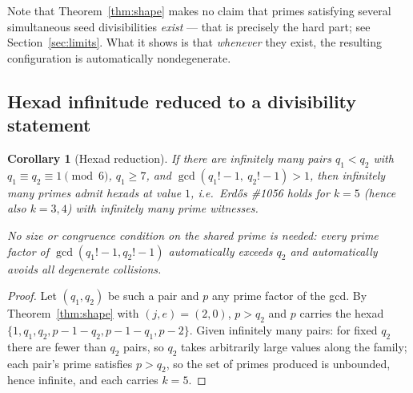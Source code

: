 \documentclass[11pt]{article}
\newtheorem{corollary}[theorem]{Corollary}
\theoremstyle{definition}
\theoremstyle{remark}
\begin{document}
Note that Theorem~\ref{thm:shape} makes no claim that primes satisfying
several simultaneous seed divisibilities \emph{exist} --- that is precisely
the hard part; see Section~\ref{sec:limits}. What it shows is that
\emph{whenever} they exist, the resulting configuration is automatically
nondegenerate.

\subsection{Hexad infinitude reduced to a divisibility statement}

\begin{corollary}[Hexad reduction]\label{cor:hexad}
If there are infinitely many pairs $q_1 < q_2$ with
$q_1 \equiv q_2 \equiv 1 \pmod 6$, $q_1 \ge 7$, and
$\gcd(q_1! - 1,\ q_2! - 1) > 1$, then infinitely many primes admit hexads at
value $1$, i.e.\ Erd\H{o}s \#1056 holds for $k = 5$ (hence also $k = 3, 4$)
with infinitely many prime witnesses.

No size or congruence condition on the shared prime is needed: every prime
factor of $\gcd(q_1!-1, q_2!-1)$ automatically exceeds $q_2$ and
automatically avoids all degenerate collisions.
\end{corollary}

\begin{proof}
Let $(q_1, q_2)$ be such a pair and $p$ any prime factor of the gcd. By
Theorem~\ref{thm:shape} with $(j, e) = (2, 0)$, $p > q_2$ and $p$ carries the
hexad $\{1, q_1, q_2, p-1-q_2, p-1-q_1, p-2\}$. Given infinitely many pairs:
for fixed $q_2$ there are fewer than $q_2$ pairs, so $q_2$ takes arbitrarily
large values along the family; each pair's prime satisfies $p > q_2$, so the
set of primes produced is unbounded, hence infinite, and each carries
$k = 5$.
\end{proof}
\end{document}

